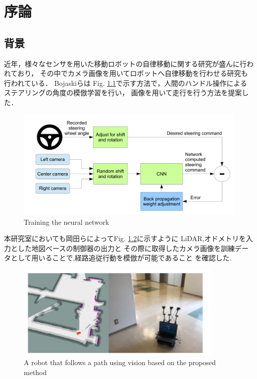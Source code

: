 \chapter{序論}
\section{背景}
近年，様々なセンサを用いた移動ロボットの自律移動に関する研究が盛んに行われており，
その中でカメラ画像を用いてロボットへ自律移動を行わせる研究も行われている．
Bojaskiら\cite{Nvidia}は
Fig. \ref{fig::nvidia}で示す方法で，人間のハンドル操作によるステアリングの角度の模倣学習を行い，
画像を用いて走行を行う方法を提案した．

\begin{figure}[h]
    \centering
    \includegraphics[width = 15cm]{./figs/EndtoEnd_Learning_for_Self-Driving_Cars.pdf}
    \caption{Training the neural network\cite{Nvidia}}
    \label{fig::nvidia}
\end{figure}

\newpage
本研究室においても岡田ら\cite{okada}によってFig. \ref{fig::okada}に示すように
LiDAR,オドメトリを入力とした地図べースの制御器の出力と
その際に取得したカメラ画像を訓練データとして用いることで,経路追従行動を模倣が可能であること
を確認した.
\begin{figure}[h]
    \centering
    \includegraphics[width = 10cm]{./figs/okada.png}
    \caption{A robot that follows a path using vision based on the proposed method\cite{okada}}
    \label{fig::okada}
\end{figure}


